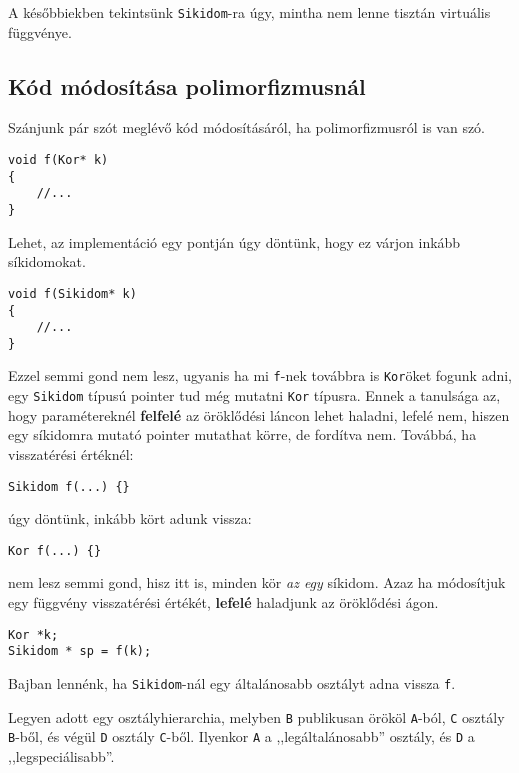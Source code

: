 \documentclass[a4paper,11.5pt]{article}
\begin{document}
	A későbbiekben tekintsünk \texttt{Sikidom}-ra úgy, mintha nem lenne tisztán virtuális függvénye.
	\subsection{Kód módosítása polimorfizmusnál}
	\smallskip
	Szánjunk pár szót meglévő kód módosításáról, ha polimorfizmusról is van szó.
	\begin{lstlisting}
void f(Kor* k)
{
	//...
}
	\end{lstlisting}
	Lehet, az implementáció egy pontján úgy döntünk, hogy ez várjon inkább síkidomokat.
	\begin{lstlisting}
void f(Sikidom* k)
{
	//...
}
	\end{lstlisting}
	Ezzel semmi gond nem lesz, ugyanis ha mi \texttt{f}-nek továbbra is \texttt{Kor}öket fogunk adni, egy \texttt{Sikidom} típusú pointer tud még mutatni \texttt{Kor} típusra. Ennek a tanulsága az, hogy paramétereknél \textbf{felfelé} az öröklődési láncon lehet haladni, lefelé nem, hiszen egy síkidomra mutató pointer mutathat körre, de fordítva nem. Továbbá, ha visszatérési értéknél:
	\begin{lstlisting}
Sikidom f(...) {}
	\end{lstlisting}
	úgy döntünk, inkább kört adunk vissza:
	\begin{lstlisting}
Kor f(...) {}
	\end{lstlisting}
	nem lesz semmi gond, hisz itt is, minden kör \textit{az egy} síkidom. Azaz ha módosítjuk egy függvény visszatérési értékét, \textbf{lefelé} haladjunk az öröklődési ágon.
	\begin{lstlisting}
Kor *k;
Sikidom * sp = f(k);
	\end{lstlisting}
	Bajban lennénk, ha \texttt{Sikidom}-nál egy általánosabb osztályt adna vissza \texttt{f}.
	\medskip
	
	Legyen adott egy osztályhierarchia, melyben \texttt{B} publikusan örököl \texttt{A}-ból, \texttt{C} osztály \texttt{B}-ből, és végül \texttt{D} osztály \texttt{C}-ből. Ilyenkor \texttt{A} a ,,legáltalánosabb'' osztály, és \texttt{D} a ,,legspeciálisabb''.
	
\end{document}
